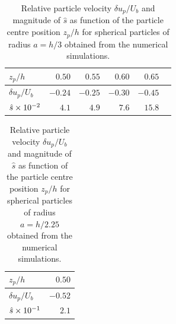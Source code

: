 \begin{table}[t]
 \centering
   \caption{Relative particle velocity $\delta u_p/U_b$ and magnitude of $\hat{s}$ as function of the particle centre position $z_p/h$ for spherical particles of radius $a=h/3$ obtained from the numerical simulations. }
   \tabulinesep=1.2mm
   \begin{tabular}{l r r r r r}
       \hline
       $z_p/h$              &$0.50$   &$0.55$   &$0.60$    &$0.65$\\
       \hline
       $\delta u_p/U_b$     &$-0.24$  &$-0.25$  &$-0.30$   &$-0.45$\\
       $\hat{s} \times 10^{-2}$     &$4.1$    &$4.9$    &$7.6$     &$15.8$\\
       \hline
   \end{tabular}
   \label{tab: h=1.5}
\end{table}

\begin{table}[t!]
 \centering
   \caption{Relative particle velocity $\delta u_p/U_b$ and magnitude of $\hat{s}$ as function of the particle centre position $z_p/h$ for spherical particles of radius $a=h/2.25$ obtained from the numerical simulations. }
   \tabulinesep=1.2mm
   \begin{tabular}{l r}
       \hline
       $z_p/h$              &$0.50$\\
       \hline
       $\delta u_p/U_b$     &$-0.52$\\
       $\hat{s} \times 10^{-1}$     &$2.1$\\
       \hline
   \end{tabular}
   \label{tab: h=1.125}
\end{table}

